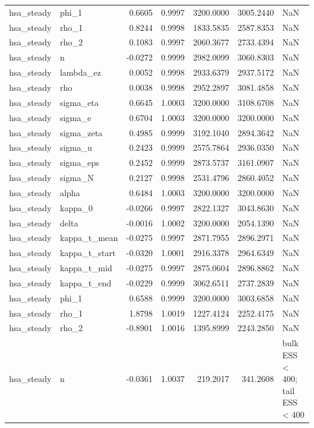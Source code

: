 \begin{tabular}{llrrrrl}
hsa\_steady & phi\_1 & 0.6605 & 0.9997 & 3200.0000 & 3005.2440 & NaN \\
hsa\_steady & rho\_1 & 0.8244 & 0.9998 & 1833.5835 & 2587.8353 & NaN \\
hsa\_steady & rho\_2 & 0.1083 & 0.9997 & 2060.3677 & 2733.4394 & NaN \\
hsa\_steady & n & -0.0272 & 0.9999 & 2982.0099 & 3060.8303 & NaN \\
hsa\_steady & lambda\_ez & 0.0052 & 0.9998 & 2933.6379 & 2937.5172 & NaN \\
hsa\_steady & rho & 0.0038 & 0.9998 & 2952.2897 & 3081.4858 & NaN \\
hsa\_steady & sigma\_eta & 0.6645 & 1.0003 & 3200.0000 & 3108.6708 & NaN \\
hsa\_steady & sigma\_e & 0.6704 & 1.0003 & 3200.0000 & 3200.0000 & NaN \\
hsa\_steady & sigma\_zeta & 0.4985 & 0.9999 & 3192.1040 & 2894.3642 & NaN \\
hsa\_steady & sigma\_u & 0.2423 & 0.9999 & 2575.7864 & 2936.0350 & NaN \\
hsa\_steady & sigma\_eps & 0.2452 & 0.9999 & 2873.5737 & 3161.0907 & NaN \\
hsa\_steady & sigma\_N & 0.2127 & 0.9998 & 2531.4796 & 2860.4052 & NaN \\
hsa\_steady & alpha & 0.6484 & 1.0003 & 3200.0000 & 3200.0000 & NaN \\
hsa\_steady & kappa\_0 & -0.0266 & 0.9997 & 2822.1327 & 3043.8630 & NaN \\
hsa\_steady & delta & -0.0016 & 1.0002 & 3200.0000 & 2054.1390 & NaN \\
hsa\_steady & kappa\_t\_mean & -0.0275 & 0.9997 & 2871.7955 & 2896.2971 & NaN \\
hsa\_steady & kappa\_t\_start & -0.0320 & 1.0001 & 2916.3378 & 2964.6349 & NaN \\
hsa\_steady & kappa\_t\_mid & -0.0275 & 0.9997 & 2875.0604 & 2896.8862 & NaN \\
hsa\_steady & kappa\_t\_end & -0.0229 & 0.9999 & 3062.6511 & 2737.2839 & NaN \\
hsa\_steady & phi\_1 & 0.6588 & 0.9999 & 3200.0000 & 3003.6858 & NaN \\
hsa\_steady & rho\_1 & 1.8798 & 1.0019 & 1227.4124 & 2252.4175 & NaN \\
hsa\_steady & rho\_2 & -0.8901 & 1.0016 & 1395.8999 & 2243.2850 & NaN \\
hsa\_steady & n & -0.0361 & 1.0037 & 219.2017 & 341.2608 & bulk ESS < 400; tail ESS < 400 \\

\end{tabular}
